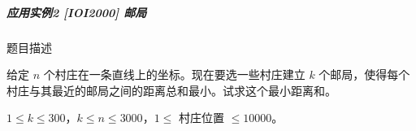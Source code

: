 \begin{Shaded}
\begin{Highlighting}[]
        \OperatorTok{(}\OperatorTok{=}\OperatorTok{,}\OperatorTok{;}\OperatorTok{+}\OperatorTok{{-}}\OperatorTok{\textless{}=}\OperatorTok{;}\OperatorTok{++)\{}
\OperatorTok{=}\OperatorTok{+}\OperatorTok{{-}}\OperatorTok{;}
            \OperatorTok{(}\OperatorTok{=}\OperatorTok{[}\OperatorTok{][}\OperatorTok{{-}}\OperatorTok{];}\OperatorTok{\textless{}=}\OperatorTok{(}\OperatorTok{{-}}\OperatorTok{,}\OperatorTok{[}\OperatorTok{+}\OperatorTok{][}\OperatorTok{]);}\OperatorTok{++)\{}
                \OperatorTok{=}\OperatorTok{[}\OperatorTok{][}\OperatorTok{]+}\OperatorTok{[}\OperatorTok{+}\OperatorTok{][}\OperatorTok{]+}\OperatorTok{(}\OperatorTok{,}\OperatorTok{);}
                \OperatorTok{(}\OperatorTok{\textless{}}\OperatorTok{[}\OperatorTok{][}\OperatorTok{])\{}
\OperatorTok{[}\OperatorTok{][}\OperatorTok{]=}\OperatorTok{;}
\OperatorTok{[}\OperatorTok{][}\OperatorTok{]=}\OperatorTok{;}
                \OperatorTok{\}}
            \OperatorTok{\}}
        \OperatorTok{\}}
    \OperatorTok{\}}
\OperatorTok{\textless{}\textless{}}\OperatorTok{[}\OperatorTok{][}\OperatorTok{]\textless{}\textless{}}\OperatorTok{;}
     \OperatorTok{;}
\OperatorTok{\}}
\end{Highlighting}
\end{Shaded}

\subparagraph{应用实例2 {[}IOI2000{]} 邮局}

题目描述

给定 \(n\) 个村庄在一条直线上的坐标。现在要选一些村庄建立 \(k\)
个邮局，使得每个村庄与其最近的邮局之间的距离总和最小。试求这个最小距离和。

\(1\le k\le 300\)，\(k\le n\le 3000\)，\(1\le\) 村庄位置 \(\le 10000\)。

